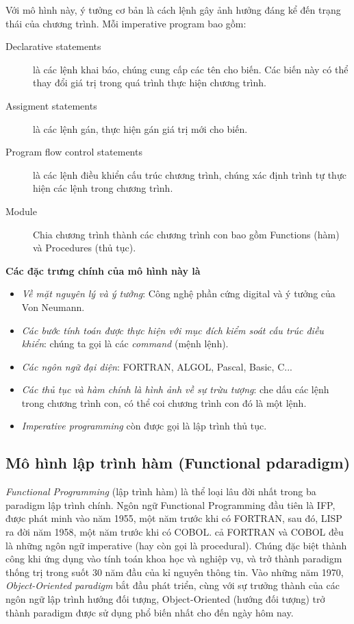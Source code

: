 \documentclass[10pt, a4paper]{article}
\begin{document}
Với mô hình này, ý tưởng cơ bản là cách lệnh gây ảnh hưởng đáng kể đến trạng thái của chương trình. Mỗi imperative program bao gồm:
\begin{description}
\item [Declarative statements] là các lệnh khai báo, chúng cung cấp các tên cho biến. Các biến này có thể thay đổi giá trị trong quá trình thực hiện chương trình.
\item [Assigment statements] là các lệnh gán, thực hiện gán giá trị mới cho biến.
\item [Program flow control statements] là các lệnh điều khiển cấu trúc chương trình, chúng xác định trình tự thực hiện các lệnh trong chương trình.
\item [Module] Chia chương trình thành các chương trình con bao gồm \textsf{Functions} (hàm) và \textsf{Procedures} (thủ tục).
\end{description}
\textbf{Các đặc trưng chính của mô hình này là}
\begin{itemize}
\item \textit{Về mặt nguyên lý và ý tưởng}: Công nghệ phần cứng digital và ý tưởng của Von Neumann.
\item \textit{Các bước tính toán được thực hiện với mục đích kiểm soát cấu trúc điều khiển}: chúng ta gọi là các \emph{command} (mệnh lệnh).
\item \textit{Các ngôn ngữ đại diện}: FORTRAN, ALGOL, Pascal, Basic, C...
\item \textit{Các thủ tục và hàm chính là hình ảnh về sự trừu tượng}: che dấu các lệnh trong chương trình con, có thể coi chương trình con đó là một lệnh.
\item \emph{Imperative programming} còn được gọi là lập trình thủ tục.
\end{itemize}

\subsection{Mô hình lập trình hàm (Functional pdaradigm)}

\emph{Functional Programming} (lập trình hàm) là thể loại lâu đời nhất trong ba paradigm lập trình chính. Ngôn ngữ Functional Programming đầu tiên là IFP, được phát minh vào năm 1955, một năm trước khi có FORTRAN, sau đó, LISP ra đời năm 1958, một năm trước khi có COBOL. cả FORTRAN và COBOL đều là những ngôn ngữ imperative (hay còn gọi là procedural). Chúng đặc biệt thành công khi ứng dụng vào tính toán khoa học và nghiệp vụ, và trở thành paradigm thống trị trong suốt 30 năm đầu của kỉ nguyên thông tin. Vào những năm 1970, \emph{Object-Oriented paradigm} bắt đầu phát triển, cùng với sự trưởng thành của các ngôn ngữ lập trình hướng đối tượng, Object-Oriented (hướng đối tượng) trở thành paradigm được sử dụng phổ biến nhất cho đến ngày hôm nay.\\
\end{document}
